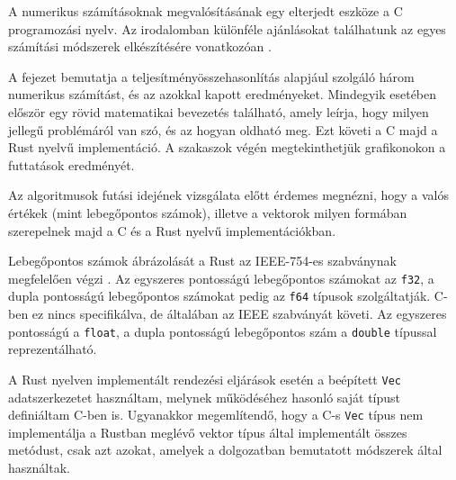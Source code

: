 
A numerikus számításoknak megvalósításának egy elterjedt eszköze a C programozási nyelv. Az irodalomban különféle ajánlásokat találhatunk az egyes számítási módszerek elkészítésére vonatkozóan \cite{numericalrecipes}.

A fejezet bemutatja a teljesítményösszehasonlítás alapjául szolgáló három numerikus számítást, és az azokkal kapott eredményeket. Mindegyik esetében először egy rövid matematikai bevezetés található, amely leírja, hogy milyen jellegű problémáról van szó, és az hogyan oldható meg. Ezt követi a C majd a Rust nyelvű implementáció. A szakaszok végén megtekinthetjük grafikonokon a futtatások eredményét.


Az algoritmusok futási idejének vizsgálata előtt érdemes megnézni, hogy a valós értékek (mint lebegőpontos számok), illetve a vektorok milyen formában szerepelnek majd a C és a Rust nyelvű implementációkban.

Lebegőpontos számok ábrázolását a Rust az IEEE-754-es szabványnak megfelelően végzi \cite{ieee}. Az egyszeres pontosságú lebegőpontos számokat az \lstinline{f32}, a dupla pontosságú lebegőpontos számokat pedig az \lstinline{f64} típusok szolgáltatják. C-ben ez nincs specifikálva, de általában az IEEE szabványát követi. Az egyszeres pontosságú a \lstinline{float}, a dupla pontosságú lebegőpontos szám a \lstinline{double} típussal reprezentálható.

A Rust nyelven implementált rendezési eljárások esetén a beépített \lstinline{Vec} adatszerkezetet használtam, melynek működéséhez hasonló saját típust definiáltam C-ben is. Ugyanakkor megemlítendő, hogy a C-s \lstinline{Vec} típus nem implementálja a Rustban meglévő vektor típus által implementált összes metódust, csak azt azokat, amelyek a dolgozatban bemutatott módszerek által használtak.

